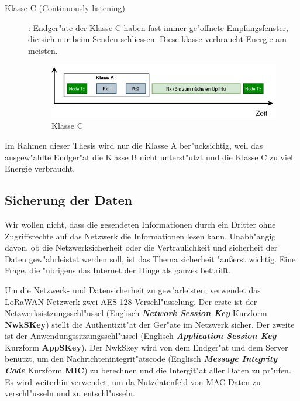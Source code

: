 \begin{description}
	\item [Klasse C (Continuously listening)]: Endger"ate der Klasse C haben fast immer ge"offnete Empfangsfenster, die sich nur beim Senden schliessen. Diese klasse verbraucht Energie am meisten.
	
	\begin{figure}[h]
		\centering
		\includegraphics[width=13cm]{source/images/ClassC}
		\caption{Klasse C \label{fig:classC}}
	\end{figure}

\end{description}

\vspace{10cm}
Im Rahmen dieser Thesis wird nur die Klasse A ber"ucksichtig, weil das ausgew"ahlte Endger"at die Klasse B nicht unterst"utzt und die Klasse C zu viel Energie verbraucht. 

\subsection{Sicherung der Daten}\label{secure}

Wir wollen nicht, dass die gesendeten Informationen durch ein Dritter ohne Zugriffsrechte auf das Netzwerk die Informationen lesen kann. Unabh"angig davon, ob die Netzwerksicherheit oder die Vertraulichkeit und sicherheit der Daten gew"ahrleistet werden soll, ist das Thema sicherheit "au\ss{}erst wichtig. Eine Frage, die "ubrigens das Internet der Dinge als ganzes bettrifft.

Um die Netzwerk- und Datensicherheit zu gew"arleisten, verwendet das LoRaWAN-Netzwerk zwei AES-128-Verschl"usselung. Der erste ist der Netzwerksistzungsschl"ussel (Englisch \textbf{\textit{Network Session Key}} Kurzform \textbf{NwkSKey}) stellt die Authentizit"at der Ger"ate im Netzwerk sicher. Der zweite ist der Anwendungssitzungsschl"ussel
(Englisch \textbf{\textit{Application Session Key}} Kurzform \textbf{AppSKey}). Der NwkSkey wird von dem Endger"at und dem Server benutzt, um den Nachrichtenintegrit"atscode (Englisch \textbf{\textit{Message Integrity Code}} Kurzform \textbf{MIC}) zu berechnen und die Intergit"at aller Daten zu pr"ufen.  Es wird weiterhin verwendet, um da  Nutzdatenfeld von MAC-Daten zu verschl"usseln und zu entschl"usseln. 

